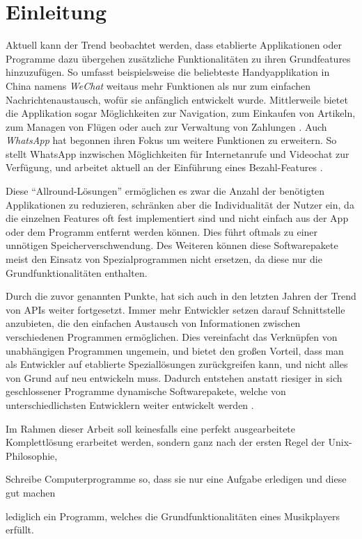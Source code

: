 
\chapter{Einleitung}
Aktuell kann der Trend beobachtet werden, dass etablierte Applikationen oder
Programme dazu übergehen zusätzliche Funktionalitäten zu ihren Grundfeatures
hinzuzufügen. So umfasst beispielsweise die beliebteste Handyapplikation in China namens
\textit{WeChat} weitaus mehr Funktionen als nur zum einfachen
Nachrichtenaustausch, wofür sie anfänglich entwickelt wurde. Mittlerweile
bietet die Applikation sogar Möglichkeiten zur Navigation, zum
Einkaufen von Artikeln, zum Managen von Flügen oder auch zur Verwaltung von
Zahlungen \autocite{was_ist_wechat?_2019}. Auch \textit{WhatsApp} hat begonnen ihren
Fokus um weitere Funktionen zu erweitern. So stellt WhatsApp inzwischen
Möglichkeiten für Internetanrufe und Videochat zur Verfügung, und arbeitet
aktuell an der Einführung eines Bezahl-Features \autocite{shead_2019}. \hfill


Diese \enquote{Allround-Lösungen} \space ermöglichen es zwar die Anzahl der
benötigten Applikationen zu reduzieren, schränken aber die Individualität der
Nutzer ein, da die einzelnen Features oft fest implementiert sind und nicht
einfach aus der App oder dem Programm entfernt werden können. Dies führt
oftmals zu einer unnötigen Speicherverschwendung. Des Weiteren können diese
Softwarepakete meist den Einsatz von Spezialprogrammen nicht ersetzen, da diese
nur die Grundfunktionalitäten enthalten. \hfill


Durch die zuvor genannten Punkte, hat sich auch in den letzten Jahren der Trend
von \acp{API} weiter fortgesetzt. Immer mehr Entwickler setzen darauf
Schnittstelle anzubieten, die den einfachen Austausch von Informationen zwischen verschiedenen
Programmen ermöglichen. Dies vereinfacht das Verknüpfen von unabhängigen
Programmen ungemein, und bietet den großen Vorteil, dass man als Entwickler auf
etablierte Speziallösungen zurückgreifen kann, und nicht alles von Grund auf
neu entwickeln muss. Dadurch entstehen anstatt riesiger in sich geschlossener Programme
dynamische Softwarepakete, welche von unterschiedlichsten Entwicklern weiter
entwickelt werden \autocite{babati_2018} \autocite{sandoval_2018}. \hfill \break

Im Rahmen dieser Arbeit soll keinesfalls eine perfekt ausgearbeitete
Komplettlösung erarbeitet werden, sondern ganz nach der ersten Regel der
Unix-Philosophie, 
\begin{enquote}
Schreibe Computerprogramme so, dass sie nur eine Aufgabe erledigen und diese gut machen \autocite{gancarz_1997}
\end{enquote}
lediglich ein Programm, welches die Grundfunktionalitäten eines Musikplayers erfüllt.


